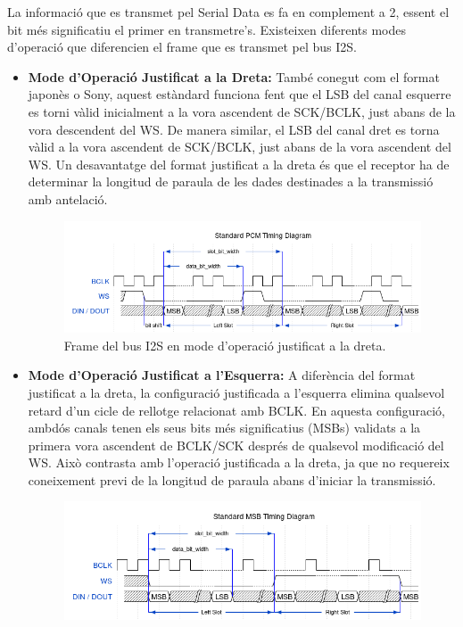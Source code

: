\par La informació que es transmet pel Serial Data es fa en complement a 2, essent el bit més significatiu el primer en transmetre's. Existeixen diferents modes d'operació que diferencien el frame que es transmet pel bus I2S.
\begin{itemize}
    \item \textbf{Mode d'Operació Justificat a la Dreta:} També conegut com el format japonès o Sony, aquest estàndard funciona fent que el LSB del canal esquerre es torni vàlid inicialment a la vora ascendent de SCK/BCLK, just abans de la vora descendent del WS. De manera similar, el LSB del canal dret es torna vàlid a la vora ascendent de SCK/BCLK, just abans de la vora ascendent del WS. Un desavantatge del format justificat a la dreta és que el receptor ha de determinar la longitud de paraula de les dades destinades a la transmissió amb antelació.
    \begin{figure}[H]
        \centering
        \includegraphics[width=0.7\linewidth]{Images/IS2PCM.png}
        \caption{Frame del bus I2S en mode d'operació justificat a la dreta. \cite{I2SESP32}}
        \label{I2SRightJust_fig}
    \end{figure}
    \item \textbf{Mode d'Operació Justificat a l'Esquerra:} A diferència del format justificat a la dreta, la configuració justificada a l'esquerra elimina qualsevol retard d'un cicle de rellotge relacionat amb BCLK. En aquesta configuració, ambdós canals tenen els seus bits més significatius (MSBs) validats a la primera vora ascendent de BCLK/SCK després de qualsevol modificació del WS. Això contrasta amb l'operació justificada a la dreta, ja que no requereix coneixement previ de la longitud de paraula abans d'iniciar la transmissió.
    \begin{figure}[H]
        \centering
        \includegraphics[width=0.7\linewidth]{Images/I2SMSB.png}

\end{figure}
\end{itemize}
